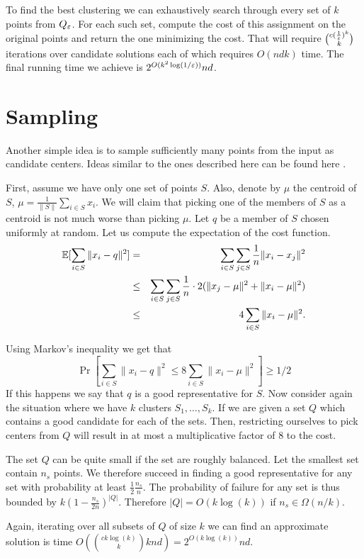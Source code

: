 To find the best clustering we can exhaustively search through every set of $k$ points from $Q_{\varepsilon}$.
For each such set, compute the cost of this assignment on the original points and return the one minimizing the cost.
That will require ${c(\frac{1}{\varepsilon})^k \choose k}$ iterations over candidate solutions each of which requires $O(ndk)$ time. 
The final running time we achieve is $2^{O(k^2\log(1/\varepsilon))}nd$. 


\section{Sampling}
Another simple idea is to sample sufficiently many points from the input as candidate centers.
Ideas similar to the ones described here can be found here \cite{ZhaHDGS01}.

First, assume we have only one set of points $S$. 
Also, denote by $\mu$ the centroid of $S$, $\mu = \frac{1}{\|S\|}\sum_{i \in S} x_i$.
We will claim that picking one of the members of $S$ as a centroid is not much worse than
picking $\mu$.
Let $q$ be a member of $S$ chosen uniformly at random.
Let us compute the expectation of the cost function.
\begin{eqnarray}
{\mathbb E}[\sum_{i \in S} \|x_i - q\|^2] &=& \sum_{i \in S} \sum_{j \in S} \frac{1}{n}\|x_i - x_j\|^2  \\
&\le& \sum_{i \in S} \sum_{j \in S} \frac{1}{n}\cdot2(\|x_j - \mu\|^2 + \|x_i - \mu\|^2) \\
&\le& 4 \sum_{i \in S}  \|x_i - \mu\|^2.
\end{eqnarray}

Using Markov's inequality we get that
\[
\Pr[\sum_{i \in S} \|x_i - q\|^2 \le 8\sum_{i \in S}  \|x_i - \mu\|^2] \ge 1/2
\]
If this happens we say that $q$ is a good representative for $S$.
Now consider again the situation where we have $k$ clusters $S_1,\dots,S_k$.
If we are given a set $Q$ which contains a good candidate for each of the sets.
Then, restricting ourselves to pick centers from $Q$ will result in at most a multiplicative factor of $8$ to the cost.

The set $Q$ can be quite small if the set are roughly balanced.
Let the smallest set contain $n_s$ points. 
We therefore succeed in finding a good representative for any set with probability at least $\frac{1}{2}\frac{n_s}{n}$.
The probability of failure for any set is thus bounded by $k (1 - \frac{n_s}{2n})^{|Q|}$.
Therefore $|Q| = O(k \log(k))$ if $n_s \in \Omega(n/k)$.

Again, iterating over all subsets of $Q$ of size $k$ we can find an approximate 
solution is time $O({ck \log(k) \choose k}knd) = 2^{O(k \log(k))}nd$.

